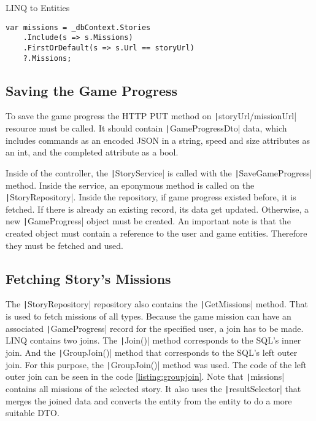 \begin{listing}
    \caption{LINQ to Entities}
    \label{listing:linq}
    \begin{verbatim}
var missions = _dbContext.Stories
    .Include(s => s.Missions)
    .FirstOrDefault(s => s.Url == storyUrl)
    ?.Missions;
    \end{verbatim}
\end{listing}

\subsection{Saving the Game Progress}

To save the game progress the HTTP PUT method on \linebreak\texttt|{storyUrl}/{missionUrl}| resource must be called.
It should contain \linebreak\texttt|GameProgressDto| data, which includes commands as an encoded JSON in a string, speed and size attributes as an int, and the completed attribute as a bool.

Inside of the controller, the \texttt|StoryService| is called with the \linebreak\texttt|SaveGameProgress| method.
Inside the service, an eponymous method is called on the \texttt|StoryRepository|.
Inside the repository, if game progress existed before, it is fetched.
If there is already an existing record, its data get updated.
Otherwise, a new \texttt|GameProgress| object must be created.
An important note is that the created object must contain a reference to the user and game entities.
Therefore they must be fetched and used.

\subsection{Fetching Story's Missions}

The \texttt|StoryRepository| repository also contains the \texttt|GetMissions| method.
That is used to fetch missions of all types.
Because the game mission can have an associated \texttt|GameProgress| record for the specified user, a join has to be made.
LINQ contains two joins.
The \texttt|Join()| method corresponds to the SQL's inner join.
And the \texttt|GroupJoin()| method that corresponds to the SQL's left outer join.
For this purpose, the \texttt|GroupJoin()| method was used.
The code of the left outer join can be seen in the code \ref{listing:groupjoin}.
Note that \texttt|missions| contains all missions of the selected story.
It also uses the \texttt|resultSelector| that merges the joined data and converts the entity from the entity to do a more suitable DTO.

